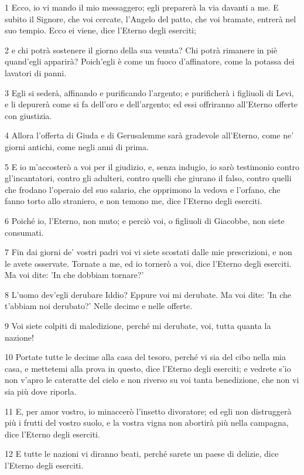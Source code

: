 \par 1 Ecco, io vi mando il mio messaggero; egli preparerà la via davanti a me. E subito il Signore, che voi cercate, l'Angelo del patto, che voi bramate, entrerà nel suo tempio. Ecco ei viene, dice l'Eterno degli eserciti;
\par 2 e chi potrà sostenere il giorno della sua venuta? Chi potrà rimanere in piè quand'egli apparirà? Poich'egli è come un fuoco d'affinatore, come la potassa dei lavatori di panni.
\par 3 Egli si sederà, affinando e purificando l'argento; e purificherà i figliuoli di Levi, e li depurerà come si fa dell'oro e dell'argento; ed essi offriranno all'Eterno offerte con giustizia.
\par 4 Allora l'offerta di Giuda e di Gerusalemme sarà gradevole all'Eterno, come ne' giorni antichi, come negli anni di prima.
\par 5 E io m'accosterò a voi per il giudizio, e, senza indugio, io sarò testimonio contro gl'incantatori, contro gli adulteri, contro quelli che giurano il falso, contro quelli che frodano l'operaio del suo salario, che opprimono la vedova e l'orfano, che fanno torto allo straniero, e non temono me, dice l'Eterno degli eserciti.
\par 6 Poiché io, l'Eterno, non muto; e perciò voi, o figliuoli di Giacobbe, non siete consumati.
\par 7 Fin dai giorni de' vostri padri voi vi siete scostati dalle mie prescrizioni, e non le avete osservate. Tornate a me, ed io tornerò a voi, dice l'Eterno degli eserciti. Ma voi dite: 'In che dobbiam tornare?'
\par 8 L'uomo dev'egli derubare Iddio? Eppure voi mi derubate. Ma voi dite: 'In che t'abbiam noi derubato?' Nelle decime e nelle offerte.
\par 9 Voi siete colpiti di maledizione, perché mi derubate, voi, tutta quanta la nazione!
\par 10 Portate tutte le decime alla casa del tesoro, perché vi sia del cibo nella mia casa, e mettetemi alla prova in questo, dice l'Eterno degli eserciti; e vedrete s'io non v'apro le cateratte del cielo e non riverso su voi tanta benedizione, che non vi sia più dove riporla.
\par 11 E, per amor vostro, io minaccerò l'insetto divoratore; ed egli non distruggerà più i frutti del vostro suolo, e la vostra vigna non abortirà più nella campagna, dice l'Eterno degli eserciti.
\par 12 E tutte le nazioni vi diranno beati, perché sarete un paese di delizie, dice l'Eterno degli eserciti.
